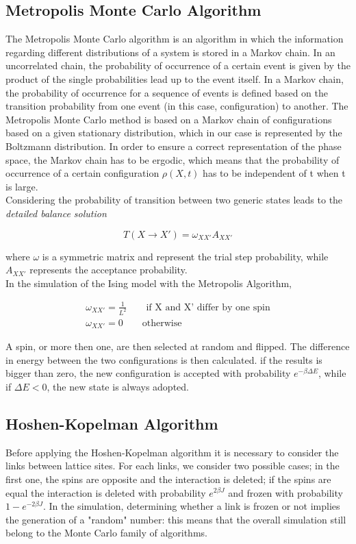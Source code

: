 \documentclass[twoside]{article}
\begin{document}
\begin{multicols}{2}
\subsection{Metropolis Monte Carlo Algorithm}
The Metropolis Monte Carlo algorithm is an algorithm in which the information regarding different distributions of a system is stored in a Markov chain. 
In an uncorrelated chain, the probability of occurrence of a certain event is given by the product of the single probabilities lead up to the event itself. In a Markov chain, the probability of occurrence for a sequence of events is defined based on the transition probability from one event (in this case, configuration) to another.
The Metropolis Monte Carlo method is based on a Markov chain of configurations based on a given stationary distribution, which in our case is represented by the Boltzmann distribution. In order to ensure a correct representation of the phase space, the Markov chain has to be ergodic, which means that the probability of occurrence of a certain configuration $\rho(X, t)$ has to be independent of t when t is large. \\
Considering the probability of transition between two generic states leads to the \emph{detailed balance solution}

\begin{equation}
T(X \rightarrow X') = \omega_{XX'}A_{XX'}
\end{equation}

where \textbf{$\omega$} is a symmetric matrix and represent the trial step probability, while $A_{XX'}$ represents the acceptance probability. \\
In the simulation of the Ising model with the Metropolis Algorithm, 

\begin{align}
\omega_{XX'} = \frac{1}{L^2} \qquad \text{if X and X' differ by one spin} \\
\omega_{XX'} = 0 \qquad  \text{otherwise} 
\end{align}

A spin, or more then one, are then selected at random and flipped. The difference in energy between the two configurations is then calculated. if the results is bigger than zero, the new configuration is accepted with probability $e^{-\beta\Delta E}$, while if $\Delta E < 0$, the new state is always adopted.

\subsection{Hoshen-Kopelman Algorithm} \label{hk_al}
Before applying the Hoshen-Kopelman algorithm it is necessary to consider the links between lattice sites. For each links, we consider two possible cases; in the first one, the spins are opposite and the interaction is deleted; if the spins are equal the interaction is deleted with probability $e^{2\beta J}$ and frozen with probability $1-e^{-2\beta J}$.
In the simulation, determining whether a link is frozen or not implies the generation of a "random" number: this means that the overall simulation still belong to the Monte Carlo family of algorithms. 


\end{multicols}
\end{document}
